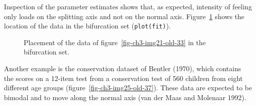 \documentclass[
  a4paper,
  DIV=11,
  numbers=noendperiod,
  oneside]{scrreprt}
\begin{document}
Inspection of the parameter estimates shows that, as expected, intensity
of feeling only loads on the splitting axis and not on the normal axis.
Figure~\ref{fig-ch3-img24-old-36} shows the location of the data in the
bifurcation set (\texttt{plot(fit)}).

\begin{figure}


\caption{\label{fig-ch3-img24-old-36}Placement of the data of
figure~\ref{fig-ch3-img21-old-33} in the bifurcation set.}

\end{figure}%

Another example is the conservation dataset of Bentler (1970), which
contains the scores on a 12-item test from a conservation test of 560
children from eight different age groups
(figure~\ref{fig-ch3-img25-old-37}). These data are expected to be
bimodal and to move along the normal axis (van der Maas and Molenaar
1992).
\end{document}
